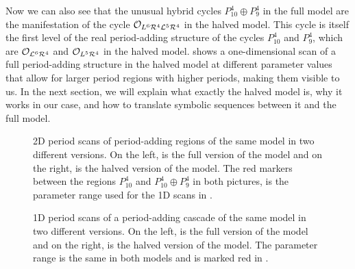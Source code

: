Now we can also see that the unusual hybrid cycles $P_{10}^4 \oplus P_9^4$ in the full model are the manifestation of the cycle $\mathcal{O}_{L^6\mathcal{R}^4\mathcal{L}^5\mathcal{R}^4}$ in the halved model.
This cycle is itself the first level of the real period-adding structure of the cycles $P_{10}^4$ and $P_9^4$, which are $\mathcal{O}_{\mathcal{L}^6\mathcal{R}^4}$ and $\mathcal{O}_{L^5\mathcal{R}^4}$ in the halved model.
 shows a one-dimensional scan of a full period-adding structure in the halved model at different parameter values that allow for larger period regions with higher periods, making them visible to us.
In the next section, we will explain what exactly the halved model is, why it works in our case, and how to translate symbolic sequences between it and the full model.

\begin{figure}
    \centering
    \caption{
        2D period scans of period-adding regions of the same model in two different versions.
        On the left, is the full version of the model and on the right, is the halved version of the model.
        The red markers between the regions $P_{10}^4$ and $P_{10}^4 \oplus P_9^4$ in both pictures, is the parameter range used for the 1D scans in .
    }
    \label{fig:minrep.adding1.corner.period}
\end{figure}

\begin{figure}
    \centering
    \caption{
        1D period scans of a period-adding cascade of the same model in two different versions.
        On the left, is the full version of the model and on the right, is the halved version of the model.
        The parameter range is the same in both models and is marked red in .
    }
    \label{fig:minrep.adding1.motivation.halved.1d.period}
\end{figure}

